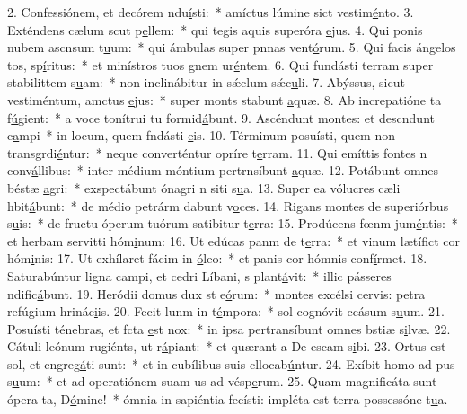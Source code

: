 2. Confessiónem, et decórem ndu\uline{í}sti:~* amíctus lúmine sict vestim\uline{é}nto.
3. Exténdens cælum scut p\uline{e}llem:~* qui tegis aquis superóra \uline{e}jus.
4. Qui ponis nubem ascnsum t\uline{u}um:~* qui ámbulas super pnnas vent\uline{ó}rum.
5. Qui facis ángelos tos, sp\uline{í}ritus:~* et minístros tuos gnem ur\uline{é}ntem.
6. Qui fundásti terram super stabilittem s\uline{u}am:~* non inclinábitur in sǽclum sǽc\uline{u}li.
7. Abýssus, sicut vestiméntum, amctus \uline{e}jus:~* super monts stabunt \uline{a}quæ.
8. Ab increpatióne ta f\uline{ú}gient:~* a voce tonítrui tu formid\uline{á}bunt.
9. Ascéndunt montes: et descndunt c\uline{a}mpi~* in locum, quem fndásti \uline{e}is.
10. Términum posuísti, quem non transgrdi\uline{é}ntur:~* neque converténtur opríre t\uline{e}rram.
11. Qui emíttis fontes n conv\uline{á}llibus:~* inter médium móntium pertrnsíbunt \uline{a}quæ.
12. Potábunt omnes béstæ \uline{a}gri:~* exspectábunt ónagri n siti s\uline{u}a.
13. Super ea vólucres cæli hbit\uline{á}bunt:~* de médio petrárm dabunt v\uline{o}ces.
14. Rigans montes de superiórbus s\uline{u}is:~* de fructu óperum tuórum satibitur t\uline{e}rra:
15. Prodúcens fœnm jum\uline{é}ntis:~* et herbam servitti hóm\uline{i}num:
16. Ut edúcas panm de t\uline{e}rra:~* et vinum lætífict cor hóm\uline{i}nis:
17. Ut exhílaret fácim in \uline{ó}leo:~* et panis cor hómnis conf\uline{í}rmet.
18. Saturabúntur ligna campi, et cedri Líbani, s plant\uline{á}vit:~* illic pásseres ndific\uline{á}bunt.
19. Heródii domus dux st e\uline{ó}rum:~* montes excélsi cervis: petra refúgium hrinác\uline{i}is.
20. Fecit lunm in t\uline{é}mpora:~* sol cognóvit ccásum s\uline{u}um.
21. Posuísti ténebras, et fcta \uline{e}st nox:~* in ipsa pertransíbunt omnes bstiæ s\uline{i}lvæ.
22. Cátuli leónum rugiénts, ut r\uline{á}piant:~* et quærant a De escam s\uline{i}bi.
23. Ortus est sol, et cngreg\uline{á}ti sunt:~* et in cubílibus suis cllocab\uline{ú}ntur.
24. Exíbit homo ad pus s\uline{u}um:~* et ad operatiónem suam us ad vésp\uline{e}rum.
25. Quam magnificáta sunt ópera ta, D\uline{ó}mine!~* ómnia in sapiéntia fecísti: impléta est terra possessóne t\uline{u}a.

